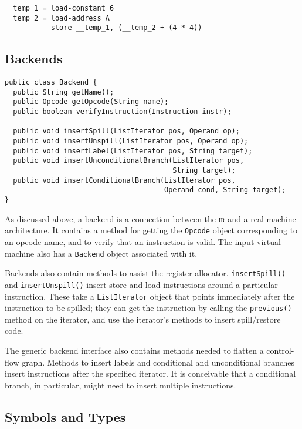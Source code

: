 \documentclass[11pt]{article}
\def\class#1{\texttt{#1}}
\def\ir{\textsc{ir}}
\begin{document}
\begin{verbatim}
__temp_1 = load-constant 6
__temp_2 = load-address A
           store __temp_1, (__temp_2 + (4 * 4))
\end{verbatim}

\subsection{Backends}

\begin{verbatim}
public class Backend {
  public String getName();
  public Opcode getOpcode(String name);
  public boolean verifyInstruction(Instruction instr);

  public void insertSpill(ListIterator pos, Operand op);
  public void insertUnspill(ListIterator pos, Operand op);
  public void insertLabel(ListIterator pos, String target);
  public void insertUnconditionalBranch(ListIterator pos,
                                        String target);
  public void insertConditionalBranch(ListIterator pos,
                                      Operand cond, String target);
}
\end{verbatim}

As discussed above, a backend is a connection between the \ir{} and a
real machine architecture.  It contains a method for getting the
\texttt{Opcode} object corresponding to an opcode name, and to verify
that an instruction is valid.  The input virtual machine also has a
\class{Backend} object associated with it.

Backends also contain methods to assist the register allocator.
\texttt{insert\-Spill()} and \texttt{insert\-Unspill()} insert store and
load instructions around a particular instruction.  These take a
\class{List\-Iterator} object that points immediately after the
instruction to be spilled; they can get the instruction by calling the
\texttt{previous()} method on the iterator, and use the iterator's
methods to insert spill/re\-store code.

The generic backend interface also contains methods needed to flatten
a control-flow graph.  Methods to insert labels and conditional and
unconditional branches insert instructions after the specified
iterator.  It is conceivable that a conditional branch, in particular,
might need to insert multiple instructions.

\subsection{Symbols and Types}
\end{document}
